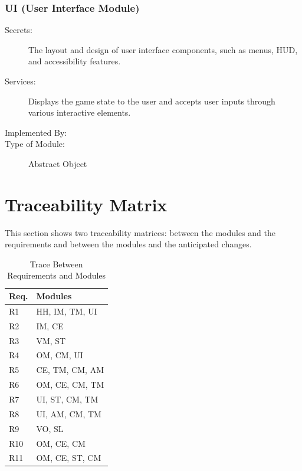 \documentclass[12pt, titlepage]{article}
\begin{document}
\subsubsection{UI (User Interface Module)}

\begin{description}
\item[Secrets:] The layout and design of user interface components, such as menus, HUD, and accessibility features.
\item[Services:] Displays the game state to the user and accepts user inputs through various interactive elements.
\item[Implemented By:] \progname{}
\item[Type of Module:] Abstract Object
\end{description}



\section{Traceability Matrix} \label{SecTM}

This section shows two traceability matrices: between the modules and the
requirements and between the modules and the anticipated changes.

\begin{table}[H]
\centering
\begin{tabular}{p{} p{}}
\toprule
\textbf{Req.} & \textbf{Modules}\\
\midrule
R1 & HH, IM, TM, UI\\
R2 & IM, CE\\
R3 & VM, ST\\
R4 & OM, CM, UI\\
R5 & CE, TM, CM, AM\\
R6 & OM, CE, CM, TM\\
R7 & UI, ST, CM, TM\\
R8 & UI, AM, CM, TM\\
R9 & VO, SL\\
R10 & OM, CE, CM\\
R11 & OM, CE, ST, CM\\
\bottomrule
\end{tabular}
\caption{Trace Between Requirements and Modules}
\label{TblRT}
\end{table}
\end{document}
